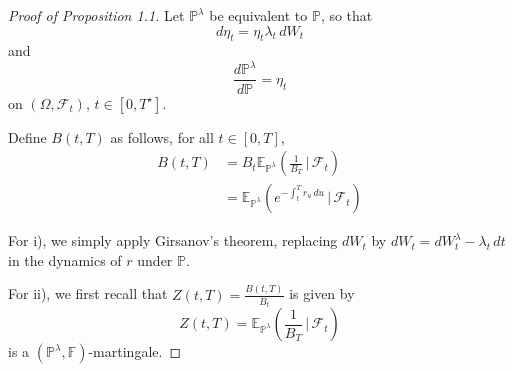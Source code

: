 \documentclass[10pt, oneside, reqno]{amsbook}
\theoremstyle{plain}%
\theoremstyle{definition}
\theoremstyle{remark}
\newcommand{\given}{ \, | \,}
\newcommand{\sigf}{\mathcal{F}}
\newcommand{\E}{\mathbb{E}}
\renewcommand{\P}{\mathbb{P}}
\newcommand{\F}{\mathbb{F}}
\numberwithin{equation}{chapter}
\begin{document}
\begin{proof}[Proof of Proposition 1.1]
    Let $\P^\lambda$ be equivalent to $\P$, so that \[
        d\eta_t = \eta_t \lambda_t \, dW_t
    \]  and \[
        \frac{d\P^\lambda}{d \P} = \eta_t
    \] on $(\Omega, \sigf_t)$, $t \in [0, T^\star]$.

    Define $B(t, T)$ as follows, for all $t \in [0, T]$, \begin{align*}
        B(t, T) &= B_t \E_{\P^\lambda} \left( \frac{1}{B_T} \given \sigf_t \right) \\
        &= \E_{\P^\lambda} \left(e^{-\int_t^T r_u \, du} \given \sigf_t \right)
    \end{align*}
    
    For i), we simply apply Girsanov's theorem, replacing $dW_t$ by $dW_t = dW^\lambda_t - \lambda_t \, dt$ in the dynamics of $r$ under $\P$.  
    
    For ii), we first recall that $Z(t, T) = \frac{B(t, T)}{B_t}$ is given by \[
        Z(t, T) = \E_{\P^\lambda} \left( \frac{1}{B_T} \given \sigf_t \right)
    \] is a $(\P^\lambda, \F)$-martingale.
    

\end{proof}
\end{document}
